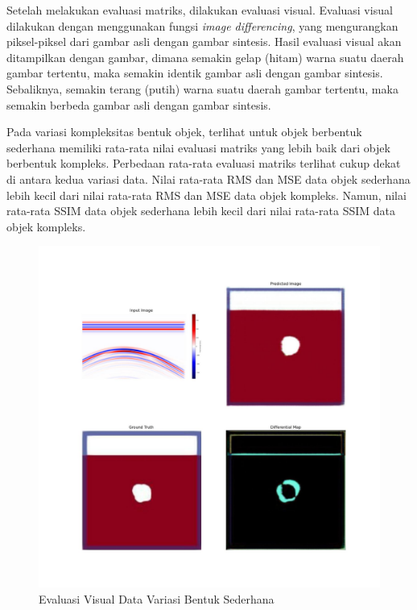 Setelah melakukan evaluasi matriks, dilakukan evaluasi visual. 
Evaluasi visual dilakukan dengan menggunakan fungsi \emph{image differencing}, yang mengurangkan piksel-piksel dari gambar asli dengan gambar sintesis. 
Hasil evaluasi visual akan ditampilkan dengan gambar, dimana semakin gelap (hitam) warna suatu daerah gambar tertentu, maka semakin identik gambar asli dengan gambar sintesis. 
Sebaliknya, semakin terang (putih) warna suatu daerah gambar tertentu, maka semakin berbeda gambar asli dengan gambar sintesis.

Pada variasi kompleksitas bentuk objek, terlihat untuk objek berbentuk sederhana memiliki rata-rata nilai evaluasi matriks yang lebih baik dari objek berbentuk kompleks. 
Perbedaan rata-rata evaluasi matriks terlihat cukup dekat di antara kedua variasi data.  
Nilai rata-rata RMS dan MSE data objek sederhana lebih kecil dari nilai rata-rata RMS dan MSE data objek kompleks. 
Namun, nilai rata-rata SSIM data objek sederhana lebih kecil dari nilai rata-rata SSIM data objek kompleks. 

\begin{figure}[ht]
  \centering
  \includegraphics[scale=0.18]{gambar/diffMapSederhana.jpg}
  \caption{Evaluasi Visual Data Variasi Bentuk Sederhana}
  \label{fig:diffmapsederhana}
\end{figure}

